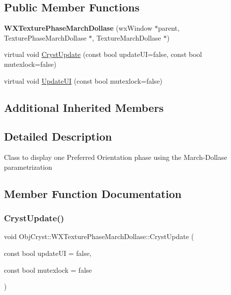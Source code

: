\subsection*{Public Member Functions}
\begin{DoxyCompactItemize}
\item 
\mbox{\label{class_obj_cryst_1_1_w_x_texture_phase_march_dollase_abcee0093325198b3c432468579b46dc2}} 
{\bfseries W\+X\+Texture\+Phase\+March\+Dollase} (wx\+Window $\ast$parent, Texture\+Phase\+March\+Dollase $\ast$, Texture\+March\+Dollase $\ast$)
\item 
virtual void \mbox{\hyperlink{class_obj_cryst_1_1_w_x_texture_phase_march_dollase_a9f7baf1967a22db565f84f354d0eaa88}{Cryst\+Update}} (const bool update\+UI=false, const bool mutexlock=false)
\item 
virtual void \mbox{\hyperlink{class_obj_cryst_1_1_w_x_texture_phase_march_dollase_ab9dffa65029bbd9d9c07e07e5b2ccf99}{Update\+UI}} (const bool mutexlock=false)
\end{DoxyCompactItemize}
\subsection*{Additional Inherited Members}


\subsection{Detailed Description}
Class to display one Preferred Orientation phase using the March-\/\+Dollase parametrization 

\subsection{Member Function Documentation}
\mbox{\label{class_obj_cryst_1_1_w_x_texture_phase_march_dollase_a9f7baf1967a22db565f84f354d0eaa88}} 
\subsubsection{\texorpdfstring{CrystUpdate()}{CrystUpdate()}}
{\footnotesize\ttfamily void Obj\+Cryst\+::\+W\+X\+Texture\+Phase\+March\+Dollase\+::\+Cryst\+Update (\begin{DoxyParamCaption}\item[{const bool}]{update\+UI = {\ttfamily false},  }\item[{const bool}]{mutexlock = {\ttfamily false} }\end{DoxyParamCaption})\hspace{0.3cm}{\ttfamily [virtual]}}

